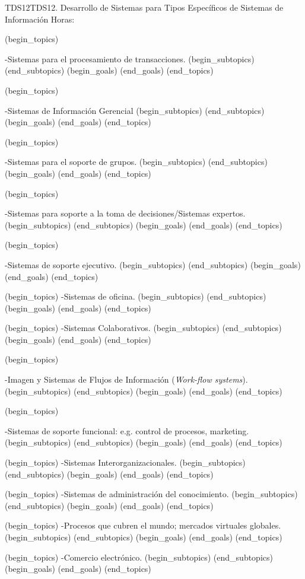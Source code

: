 \begin{BKL2}{TDS12}{TDS12. Desarrollo de Sistemas para Tipos Específicos de Sistemas de Información}
Horas:
 
(begin_topics)

-Sistemas para el procesamiento de transacciones.
(begin_subtopics)
(end_subtopics)
(begin_goals)
(end_goals)
(end_topics)

 

(begin_topics)

-Sistemas de Información Gerencial
(begin_subtopics)
(end_subtopics)
(begin_goals)
(end_goals)
(end_topics)

 

(begin_topics)

-Sistemas para el soporte de grupos.
(begin_subtopics)
(end_subtopics)
(begin_goals)
(end_goals)
(end_topics)

 

(begin_topics)

-Sistemas para soporte a la toma de decisiones/Sistemas expertos.
(begin_subtopics)
(end_subtopics)
(begin_goals)
(end_goals)
(end_topics)

 

(begin_topics)

-Sistemas de soporte ejecutivo.
(begin_subtopics)
(end_subtopics)
(begin_goals)
(end_goals)
(end_topics)

 

(begin_topics)
-Sistemas de oficina.
(begin_subtopics)
(end_subtopics)
(begin_goals)
(end_goals)
(end_topics)

 

(begin_topics)
-Sistemas Colaborativos.
(begin_subtopics)
(end_subtopics)
(begin_goals)
(end_goals)
(end_topics)

 

(begin_topics)

-Imagen y Sistemas de Flujos de Información ({\it Work-flow systems}).
(begin_subtopics)
(end_subtopics)
(begin_goals)
(end_goals)
(end_topics)

 

(begin_topics)

-Sistemas de soporte funcional: e.g. control de procesos, marketing.
(begin_subtopics)
(end_subtopics)
(begin_goals)
(end_goals)
(end_topics)

 

(begin_topics)
-Sistemas Interorganizacionales.
(begin_subtopics)
(end_subtopics)
(begin_goals)
(end_goals)
(end_topics)

(begin_topics)
-Sistemas de administración del conocimiento.
(begin_subtopics)
(end_subtopics)
(begin_goals)
(end_goals)
(end_topics)

(begin_topics)
-Procesos que cubren el mundo; mercados virtuales globales.
(begin_subtopics)
(end_subtopics)
(begin_goals)
(end_goals)
(end_topics)

(begin_topics)
-Comercio electrónico.
(begin_subtopics)
(end_subtopics)
(begin_goals)
(end_goals)
(end_topics)

\end{BKL2}



